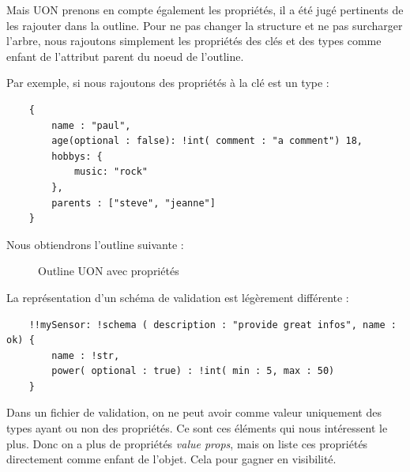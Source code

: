 \documentclass[
    iict, %
    il, %
]{heig-tb}
\begin{document}
Mais UON prenons en compte également les propriétés, il a été jugé pertinents de les rajouter dans la outline.
Pour ne pas changer la structure et ne pas surcharger l'arbre,
nous rajoutons simplement les propriétés des clés et des types comme enfant de l'attribut parent du noeud de l'outline.

Par exemple, si nous rajoutons des propriétés à la clé est un type :
\begin{lstlisting}
    {
        name : "paul",
        age(optional : false): !int( comment : "a comment") 18,
        hobbys: {
            music: "rock"
        },
        parents : ["steve", "jeanne"]
    }
\end{lstlisting}

Nous obtiendrons l'outline suivante :

\begin{figure}[!h]
    \begin{center}
    \end{center}
    \caption[Outline UON avec propriétés]{\label{uon-payload-outline-with-properties} Outline UON avec propriétés}
\end{figure}

La représentation d'un schéma de validation est légèrement différente :

\begin{lstlisting}
    !!mySensor: !schema ( description : "provide great infos", name : ok) {
        name : !str,
        power( optional : true) : !int( min : 5, max : 50)
    }
\end{lstlisting}

Dans un fichier de validation, on ne peut avoir comme valeur uniquement des types ayant ou non des propriétés. Ce sont ces éléments qui nous intéressent le plus.
Donc on a plus de propriétés \emph{value props}, mais on liste ces propriétés directement comme enfant de l'objet. Cela pour gagner en visibilité.
\end{document}
